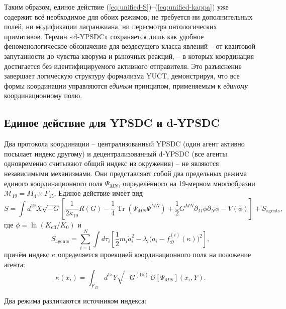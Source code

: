 \documentclass[11pt,a4paper]{article}
\DeclareMathOperator*{\Tr}{Tr}
\begin{document}
	Таким образом, единое действие (\ref{eq:unified-S})--(\ref{eq:unified-kappa}) уже содержит всё необходимое для обоих режимов; не требуется ни дополнительных полей, ни модификации лагранжиана, ни пересмотра онтологических примитивов.
	Термин «d‑YPSDC» сохраняется лишь как удобное феноменологическое обозначение
	для вездесущего класса явлений – от квантовой запутанности до чувства кворума
	и рыночных реакций, – в которых координация достигается без идентифицируемого
	активного отправителя. Это разъяснение завершает логическую структуру формализма YUCT, демонстрируя, что все формы координации управляются
	\emph{единым} принципом, применяемым к \emph{единому} координационному полю.
	
	\subsection{Единое действие для YPSDC и d‑YPSDC}
	\label{subsec:unified-action}
	
	Два протокола координации – централизованный YPSDC (один агент активно посылает
	индекс другому) и децентрализованный d‑YPSDC (все агенты одновременно
	считывают общий индекс из окружения) – не являются независимыми механизмами. Они
	представляют собой два предельных режима единого координационного поля \(\Psi_{MN}\), определённого на
	19-мерном многообразии \(\mathcal{M}_{19}=M_4\times F_{15}\). Единое
	действие имеет вид
	\begin{equation}
		S = \int d^{19}X \sqrt{-G} \left[ \frac{1}{2\kappa_{19}} R(G)
		- \frac{1}{4} \Tr(\Psi_{MN}\Psi^{MN}) + \frac{1}{2} G^{MN}\partial_M\phi \partial_N\phi
		- V(\phi) \right] + S_{\mathrm{agents}},
		\label{eq:unified-S}
	\end{equation}
	где \(\phi = \ln(K_{\mathrm{eff}}/K_0)\) и
	\begin{equation}
		S_{\mathrm{agents}} = \sum_{i=1}^{N} \int d\tau_i \left[ \frac{1}{2} m_i \dot a_i^2
		- \lambda_i \bigl( a_i - f_{\mathcal{D}}^{(i)}(\kappa) \bigr)^2 \right],
		\label{eq:unified-agents}
	\end{equation}
	причём индекс \(\kappa\) определяется проекцией координационного поля
	на положение агента:
	\begin{equation}
		\kappa(x_i) = \int_{F_{15}} d^{15}Y \sqrt{-G^{(15)}}\,
		\mathcal{O}[\Psi_{MN}](x_i, Y).
		\label{eq:unified-kappa}
	\end{equation}
	
	Два режима различаются источником индекса:
	
\end{document}
